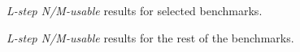 \documentclass{article}
\begin{document}
\begin{figure}

\caption{\emph{L-step N/M-usable} results for selected benchmarks.}
\end{figure}

\newpage

\begin{figure}

\caption{\emph{L-step N/M-usable} results for the rest of the benchmarks.}
\end{figure}
\end{document}
